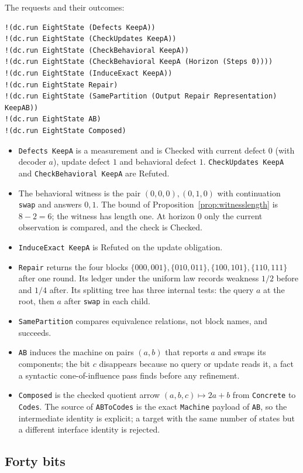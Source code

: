 \documentclass[11pt]{article}
\newcommand{\code}[1]{\texttt{#1}}
\theoremstyle{definition}
\theoremstyle{plain}
\begin{document}
The requests and their outcomes:
\begin{lstlisting}[basicstyle=\ttfamily\footnotesize,title={\scriptsize\ttfamily fixtures/eight\_state.metta}]
!(dc.run EightState (Defects KeepA))
!(dc.run EightState (CheckUpdates KeepA))
!(dc.run EightState (CheckBehavioral KeepA))
!(dc.run EightState (CheckBehavioral KeepA (Horizon (Steps 0))))
!(dc.run EightState (InduceExact KeepA))
!(dc.run EightState Repair)
!(dc.run EightState (SamePartition (Output Repair Representation) KeepAB))
!(dc.run EightState AB)
!(dc.run EightState Composed)
\end{lstlisting}
\begin{itemize}
\item \code{Defects KeepA} is a measurement and is Checked with current defect $0$ (with decoder
$a$), update defect $1$ and behavioral defect $1$. \code{CheckUpdates KeepA} and
\code{CheckBehavioral KeepA} are Refuted.
\item The behavioral witness is the pair $(0,0,0),(0,1,0)$ with continuation \code{swap} and
answers $0,1$. The bound of Proposition~\ref{prop:witnesslength} is $8-2=6$; the witness has
length one. At horizon $0$ only the current observation is compared, and the check is Checked.
\item \code{InduceExact KeepA} is Refuted on the update obligation.
\item \code{Repair} returns the four blocks $\{000,001\},\{010,011\},\{100,101\},\{110,111\}$ after
one round. Its ledger under the uniform law records weakness $1/2$ before and $1/4$ after. Its
splitting tree has three internal tests: the query $a$ at the root, then $a$ after \code{swap} in
each child.
\item \code{SamePartition} compares equivalence relations, not block names, and succeeds.
\item \code{AB} induces the machine on pairs $(a,b)$ that reports $a$ and swaps its components;
the bit $c$ disappears because no query or update reads it, a fact a syntactic cone-of-influence
pass finds before any refinement.
\item \code{Composed} is the checked quotient arrow $(a,b,c)\mapsto2a+b$ from \code{Concrete} to
\code{Codes}. The source of \code{ABToCodes} is the exact \code{Machine} payload of \code{AB}, so the
intermediate identity is explicit; a target with the same number of states but a different
interface identity is rejected.
\end{itemize}

\subsection{Forty bits}\label{sec:fortybits}
\end{document}

